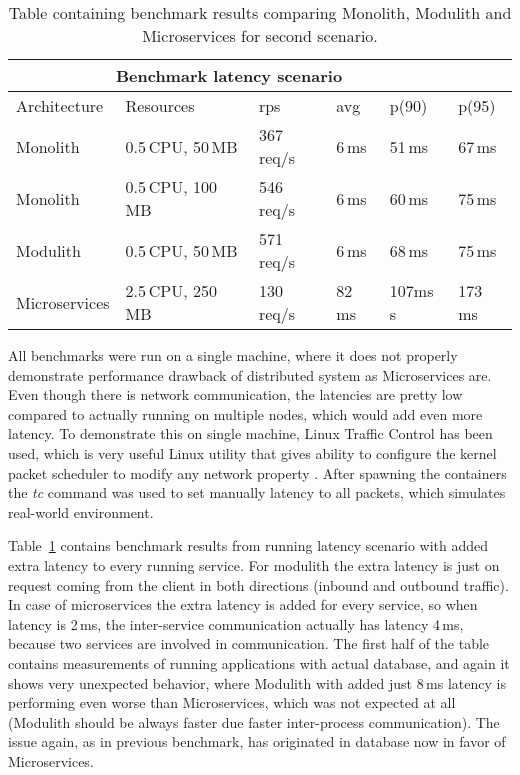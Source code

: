 \begin{table}
    \begin{tabular}{ |p{3cm}||p{3cm}|p{1.5cm}|p{1.5cm}|p{1.5cm}|p{1.5cm}| }
        \hline
        \multicolumn{5}{|c|}{Benchmark latency scenario}                                       \\
        \hline
        Architecture  & Resources         & rps        & avg    & p(90)    & p(95)   \\
        \hline
        \rowcolor{Gray}
        Monolith      & 0.5\,CPU, 50\,MB  & 367\,req/s & 6\,ms  & 51\,ms   & 67\,ms  \\
        Monolith      & 0.5\,CPU, 100\,MB & 546\,req/s & 6\,ms  & 60\,ms   & 75\,ms  \\
        \rowcolor{Gray}
        Modulith      & 0.5\,CPU, 50\,MB  & 571\,req/s & 6\,ms  & 68\,ms   & 75\,ms  \\
        Microservices & 2.5\,CPU, 250\,MB & 130\,req/s & 82\,ms & 107ms\,s & 173\,ms \\
        \hline
    \end{tabular}
    \caption{Table containing benchmark results comparing Monolith, Modulith and Microservices for second scenario.\label{table:benchmark_scenario2}}
\end{table}

All benchmarks were run on a single machine, where it does not properly demonstrate performance drawback of distributed system as Microservices are. Even though there is network communication, the latencies are pretty low compared to actually running on multiple nodes, which would add even more latency. To demonstrate this on single machine, Linux Traffic Control has been used, which is very useful Linux utility that gives ability to configure the kernel packet scheduler to modify any network property \cite{MAN_TRAFFIC_CONTROLL}. After spawning the containers the \textit{tc} command was used to set manually latency to all packets, which simulates real-world environment.

Table~\ref{table:benchmark_scenario2} contains benchmark results from running latency scenario with added extra latency to every running service. For modulith the extra latency is just on request coming from the client in both directions (inbound and outbound traffic). In case of microservices the extra latency is added for every service, so when latency is 2\,ms, the inter-service communication actually has latency 4\,ms, because two services are involved in communication. The first half of the table contains measurements of running applications with actual database, and again it shows very unexpected behavior, where Modulith with added just 8\,ms latency is performing even worse than Microservices, which was not expected at all (Modulith should be always faster due faster inter-process communication). The issue again, as in previous benchmark, has originated in database now in favor of Microservices.


